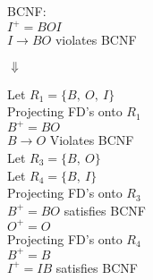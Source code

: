 \documentclass[12pt]{article}
\begin{document}
BCNF:\\
$I^+ = BOI$\\
$I \rightarrow BO$ violates BCNF
\begin{center}
    $\Downarrow$
\end{center}
\begin{minipage}[t]{0.5\textwidth} %
    Let $R_1 = \{B,\ O,\ I\}$\\

    Projecting FD's onto $R_1$\\
    $B^+ = BO$ \\
    $B \rightarrow O$ Violates BCNF\\


    Let $R_3 = \{B,\ O\}$\\
    Let $R_4 = \{B,\ I\}$\\

    Projecting FD's onto $R_3$\\
    $B^+ = BO$ satisfies BCNF\\
    $O^+ = O$\\

    Projecting FD's onto $R_4$\\
    $B^+ = B$ \\
    $I^+ = IB$ satisfies BCNF\\

\end{minipage}
\end{document}
